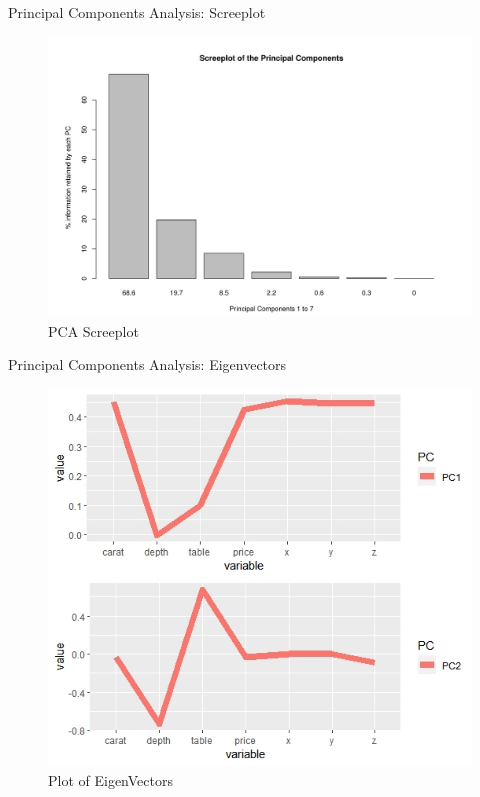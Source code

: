 \documentclass[
  ignorenonframetext,
]{beamer}
\begin{document}
\begin{frame}{Principal Components Analysis: Screeplot}
\protect\hypertarget{principal-components-analysis-screeplot}{}
\begin{figure}
\centering
\includegraphics{./PCA screeplot.jpg}
\caption{PCA Screeplot}
\end{figure}
\end{frame}

\begin{frame}{Principal Components Analysis: Eigenvectors}
\protect\hypertarget{principal-components-analysis-eigenvectors}{}
\begin{figure}
\centering
\includegraphics[width=\textwidth,height=0.85\textheight]{./Eigenvector Plot.jpeg}
\caption{Plot of EigenVectors}
\end{figure}
\end{frame}
\end{document}
